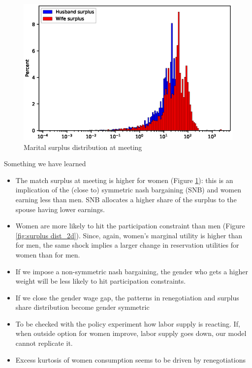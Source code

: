 \documentclass[]{article}
\begin{document}
\begin{figure}[H]
	\centering
	\includegraphics[width=\textwidth]{surplus_dist_i_2d.eps} 
	\caption{Marital surplus distribution at meeting}
	\label{fig:surplus dist_i_2d}
\end{figure}


Something we have learned
\begin{itemize}
	\item The match surplus at meeting is higher for women (Figure \ref{fig:surplus dist_i_2d}): this is an implication of the (close to) symmetric nash bargaining (SNB) and women earning less than men. SNB allocates a higher share of the surplus to the spouse having lower earnings. 
	\item Women are more likely to hit the participation constraint than men (Figure \ref{fig:surplus dist_2d}). Since, again, women's marginal utility is higher than for men, the same shock implies a larger change in reservation utilities for women than for men.
	\item If we impose a non-symmetric nash bargaining, the gender who gets a higher weight will be less likely to hit participation constraints.
	\item If we close the gender wage gap, the patterns in renegotiation and surplus share distribution become gender symmetric
	
	\item To be checked with the policy experiment how labor supply is reacting. If, when outside option for women improve, labor supply goes down, our model cannot replicate it. 
	
	\item Excess kurtosis of women consumption seems to be driven by renegotiations 
\end{itemize}
\end{document}
